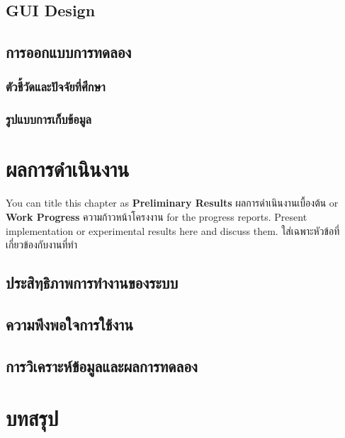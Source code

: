 \documentclass[12pt,oneside,openright,a4paper]{cpe-thai-project}
\begin{document}
\section{GUI Design}

\section{การออกแบบการทดลอง}
\subsection{ตัวชี้วัดและปัจจัยที่ศึกษา}
\subsection{รูปแบบการเก็บข้อมูล}




\chapter{ผลการดำเนินงาน}

You can title this chapter as \textbf{Preliminary Results} ผลการดำเนินงานเบื้องต้น or \textbf{Work Progress} ความก้าวหน้าโครงงาน for the progress reports. Present implementation or experimental results here and discuss them.
ใส่เฉพาะหัวข้อที่เกี่ยวข้องกับงานที่ทำ 

\section{ประสิทฺธิภาพการทำงานของระบบ} 
\section{ความพึงพอใจการใช้งาน}
\section{การวิเคราะห์ข้อมูลและผลการทดลอง}

\chapter{บทสรุป}
\end{document}
